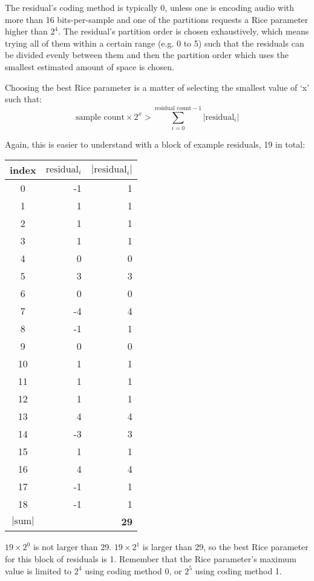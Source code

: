 The residual's coding method is typically 0, unless one is encoding
audio with more than 16 bits-per-sample and one of the partitions
requests a Rice parameter higher than $2 ^ 4$.
The residual's partition order is chosen exhaustively, which means
trying all of them within a certain range (e.g. 0 to 5) such that
the residuals can be divided evenly between them and then the partition
order which uses the smallest estimated amount of space is chosen.

Choosing the best Rice parameter is a matter of selecting the smallest
value of `x' such that:
\begin{equation}
\text{sample count} \times 2 ^ x > \overset{\text{residual count} - 1}{\underset{i = 0}{\sum}} |\text{residual}_i|
\end{equation}
\par
\noindent
Again, this is easier to understand with a block of example residuals,
19 in total:
\begin{table}[h]
{
\begin{tabular}{|c|r|r|}
\hline
index & $\text{residual}_i$ & $|\text{residual}_i|$ \\
\hline
0 & -1 & 1 \\
1 & 1 & 1 \\
2 & 1 & 1 \\
3 & 1 & 1 \\
4 & 0 & 0 \\
5 & 3 & 3 \\
6 & 0 & 0 \\
7 & -4 & 4 \\
8 & -1 & 1 \\
9 & 0 & 0 \\
10 & 1 & 1 \\
11 & 1 & 1 \\
12 & 1 & 1 \\
13 & 4 & 4 \\
14 & -3 & 3 \\
15 & 1 & 1 \\
16 & 4 & 4 \\
17 & -1 & 1 \\
18 & -1 & 1 \\
\hline
$|\text{sum}|$ & & \textbf{29} \\
\hline
\end{tabular}
}
\end{table}
\par
\noindent
$19 \times {2 ^ 0}$ is not larger than 29.
$19 \times {2 ^ 1}$ is larger than 29, so the best Rice parameter
for this block of residuals is 1.
Remember that the Rice parameter's maximum value is limited to
$2 ^ 4$ using coding method 0, or $2 ^ 5$ using coding method 1.

